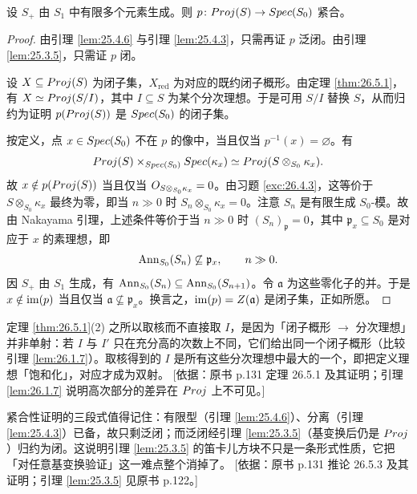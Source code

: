 \begin{corollary}\label{cor:26.5.3}
设 $S_+$ 由 $S_1$ 中有限多个元素生成。则 $p \colon Proj(S) \to Spec(S_0)$ 紧合。
\end{corollary}

\begin{proof}
由引理 \ref{lem:25.4.6} 与引理 \ref{lem:25.4.3}，只需再证 $p$ 泛闭。由引理 \ref{lem:25.3.5}，只需证 $p$ 闭。

设 $X \subseteq Proj(S)$ 为闭子集，$X_{\mathrm{red}}$ 为对应的既约闭子概形。由定理 \ref{thm:26.5.1}，有 $X \simeq Proj(S/I)$，其中 $I \subseteq S$ 为某个分次理想。于是可用 $S/I$ 替换 $S$，从而归约为证明 $p(Proj(S))$ 是 $Spec(S_0)$ 的闭子集。

按定义，点 $x \in Spec(S_0)$ 不在 $p$ 的像中，当且仅当 $p^{-1}(x) = \varnothing$。有
\[
Proj(S) \times_{Spec(S_0)} Spec(\kappa_x) \simeq Proj(S \otimes_{S_0} \kappa_x).
\]
故 $x \notin p(Proj(S))$ 当且仅当 $O_{S \otimes_{S_0} \kappa_x} = 0$。由习题 \ref{exc:26.4.3}，这等价于 $S \otimes_{S_0} \kappa_x$ 最终为零，即当 $n \gg 0$ 时 $S_n \otimes_{S_0} \kappa_x = 0$。注意 $S_n$ 是有限生成 $S_0$-模。故由 Nakayama 引理，上述条件等价于当 $n \gg 0$ 时 $(S_n)_{\mathfrak p} = 0$，其中 $\mathfrak p_x \subseteq S_0$ 是对应于 $x$ 的素理想，即
\[
\operatorname{Ann}_{S_0}(S_n) \not\subseteq \mathfrak p_x, \qquad n \gg 0.
\]
因 $S_+$ 由 $S_1$ 生成，有 $\operatorname{Ann}_{S_0}(S_n) \subseteq \operatorname{Ann}_{S_0}(S_{n+1})$。令 $\mathfrak a$ 为这些零化子的并。于是 $x \notin \operatorname{im}(p)$ 当且仅当 $\mathfrak a \not\subseteq \mathfrak p_x$。换言之，$\operatorname{im}(p) = Z(\mathfrak a)$ 是闭子集，正如所愿。
\end{proof}

\begin{yizhu}
定理 \ref{thm:26.5.1}(2) 之所以取核而不直接取 $I$，是因为「闭子概形 $\to$ 分次理想」并非单射：若 $I$ 与 $I'$ 只在充分高的次数上不同，它们给出同一个闭子概形（比较引理 \ref{lem:26.1.7}）。取核得到的 $I$ 是所有这些分次理想中最大的一个，即把定义理想「饱和化」，对应才成为双射。
[依据：原书 p.131 定理 26.5.1 及其证明；引理 \ref{lem:26.1.7} 说明高次部分的差异在 $Proj$ 上不可见。]
\end{yizhu}

\begin{yizhu}
紧合性证明的三段式值得记住：有限型（引理 \ref{lem:25.4.6}）、分离（引理 \ref{lem:25.4.3}）已备，故只剩泛闭；而泛闭经引理 \ref{lem:25.3.5}（基变换后仍是 $Proj$）归约为闭。这说明引理 \ref{lem:25.3.5} 的笛卡儿方块不只是一条形式性质，它把「对任意基变换验证」这一难点整个消掉了。
[依据：原书 p.131 推论 26.5.3 及其证明；引理 \ref{lem:25.3.5} 见原书 p.122。]
\end{yizhu}
